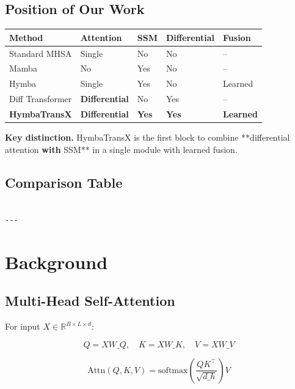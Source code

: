 \subsection{Position of Our Work}

\begin{table}[H]
\centering
\small
\begin{tabular}{lllll}
\toprule
\textbf{Method} & \textbf{Attention} & \textbf{SSM} & \textbf{Differential} & \textbf{Fusion} \\
\midrule
Standard MHSA & Single & No & No & -- \\
Mamba & No & Yes & No & -- \\
Hymba & Single & Yes & No & Learned \\
Diff Transformer & \textbf{Differential} & No & Yes & -- \\
\textbf{HymbaTransX} & \textbf{Differential} & \textbf{Yes} & \textbf{Yes} & \textbf{Learned} \\
\bottomrule
\end{tabular}
\end{table}

\textbf{Key distinction.} HymbaTransX is the first block to combine **differential 
attention\textbf{ with }SSM** in a single module with learned fusion.



\subsection{Comparison Table}

\begin{lstlisting}

---
\end{lstlisting}

\section{Background}

\subsection{Multi-Head Self-Attention}

For input $X \in \mathbb{R}^{B \times L \times d}$:

\[
Q = X W\_Q, \quad K = X W\_K, \quad V = X W\_V
\tag{3.1}
\]

\[
\text{Attn}(Q, K, V) = \text{softmax}\!\left(\frac{Q K^\top}{\sqrt{d\_h}}\right) V
\tag{3.2}
\]

